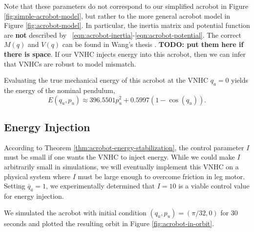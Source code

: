 \documentclass[journal,twoside,web]{ieeecolor}
\begin{document}
\begin{table}
    \centering
    \caption{Physical parameters for the real acrobot.}
    \label{tab:acrobot-parameters}
\end{table}

Note that these parameters do not correspond to our simplified acrobot in Figure
\ref{fig:simple-acrobot-model}, but rather to the more general acrobot model in
Figure \ref{fig:acrobot-model}.
In particular, the inertia matrix and potential function are \textbf{not}
described by ~\eqref{eqn:acrobot-inertia}-\eqref{eqn:acrobot-potential}.
The correct \(M(q)\) and \(V(q)\) can be found in Wang's thesis
\cite{xingbo_thesis}.
\textbf{TODO: put them here if there is space}.
If our VNHC injects energy into this acrobot, then we can infer that
VNHCs are robust to model mismatch.

Evaluating the true mechanical energy of this acrobot at the VNHC
\(q_a = 0\) yields the energy of the nominal pendulum,
\[
    E(q_u,p_u) \approx 396.5501 p_u^2 + 0.5997(1 - \cos(q_u))
    .
\]

\subsection{Energy Injection}

According to Theorem \ref{thm:acrobot-energy-stabilization}, the control
parameter \(I\) must be small if one wants the VNHC to inject energy.
While we could make \(I\) arbitrarily small in simulations, we will eventually
implement this VNHC on a physical system where \(I\) must be large enough to
overcome friction in leg motor.
Setting \(\bar{q}_a = 1\), we experimentally determined that \(I = 10\) is a
viable control value for energy injection.

We simulated the acrobot with initial condition 
\((q_u,p_u) = \left(\pi/32,0 \right)\) for \(30\) seconds and plotted the
resulting orbit in Figure \ref{fig:acrobot-in-orbit}.
\end{document}
